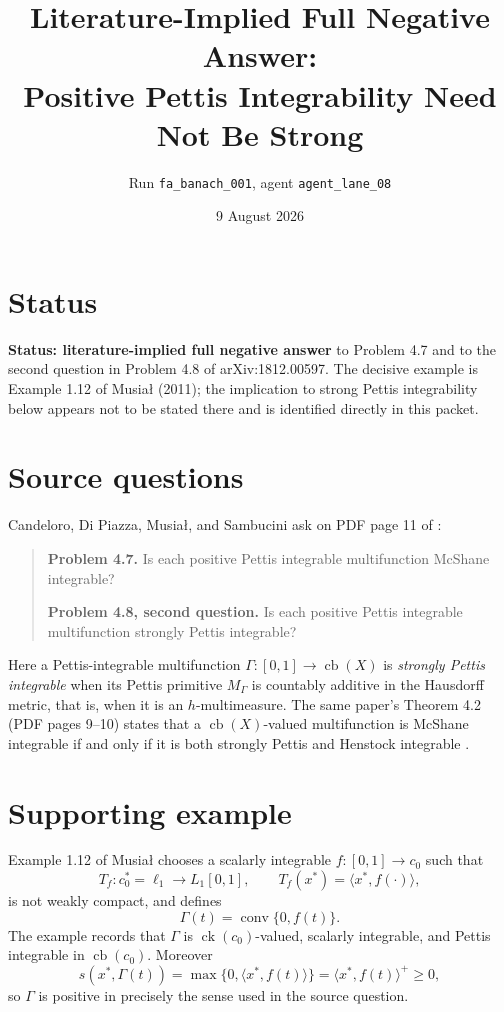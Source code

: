 \documentclass[11pt]{article}
\title{Literature-Implied Full Negative Answer:\\
Positive Pettis Integrability Need Not Be Strong}
\author{Run \texttt{fa\_banach\_001}, agent \texttt{agent\_lane\_08}}
\date{9 August 2026}
\newcommand{\cb}{\operatorname{cb}}
\newcommand{\ck}{\operatorname{ck}}
\newcommand{\co}{\operatorname{conv}}
\newcommand{\supp}{s}
\begin{document}
\maketitle

\section*{Status}

\textbf{Status: literature-implied full negative answer} to Problem 4.7 and to
the second question in Problem 4.8 of arXiv:1812.00597.  The decisive example
is Example 1.12 of Musia{\l} (2011); the implication to strong Pettis
integrability below appears not to be stated there and is identified directly
in this packet.

\section*{Source questions}

Candeloro, Di Piazza, Musia{\l}, and Sambucini ask on PDF page 11 of
\cite{source}:
\begin{quote}
\textbf{Problem 4.7.} Is each positive Pettis integrable multifunction
McShane integrable?

\textbf{Problem 4.8, second question.} Is each positive Pettis integrable
multifunction strongly Pettis integrable?
\end{quote}
Here a Pettis-integrable multifunction $\Gamma\colon[0,1]\to\cb(X)$ is
\emph{strongly Pettis integrable} when its Pettis primitive
$M_\Gamma$ is countably additive in the Hausdorff metric, that is, when it is
an $h$-multimeasure.  The same paper's Theorem 4.2 (PDF pages 9--10) states
that a $\cb(X)$-valued multifunction is McShane integrable if and only if it is
both strongly Pettis and Henstock integrable \cite{source}.

\section*{Supporting example}

Example 1.12 of Musia{\l} \cite[p.~779; PDF p.~11]{musial} chooses a scalarly
integrable $f\colon[0,1]\to c_0$ such that
\[
  T_f\colon c_0^*=\ell_1\longrightarrow L_1[0,1],
  \qquad T_f(x^*)=\langle x^*,f(\cdot)\rangle,
\]
is not weakly compact, and defines
\[
  \Gamma(t)=\co\{0,f(t)\}.
\]
The example records that $\Gamma$ is $\ck(c_0)$-valued, scalarly integrable,
and Pettis integrable in $\cb(c_0)$.  Moreover
\begin{equation}\label{eq:support}
  \supp(x^*,\Gamma(t))
  =\max\{0,\langle x^*,f(t)\rangle\}
  =\langle x^*,f(t)\rangle^+\geq 0,
\end{equation}
so $\Gamma$ is positive in precisely the sense used in the source question.
\end{document}
